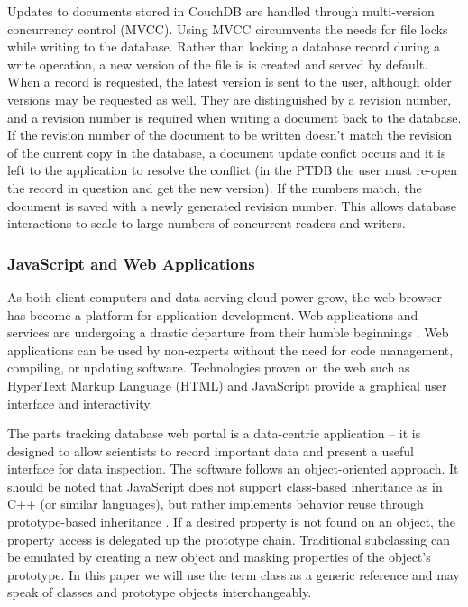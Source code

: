 \documentclass[journal]{IEEEtran}
\begin{document}
Updates to documents stored in CouchDB are handled through multi-version concurrency control (MVCC). Using MVCC
circumvents the needs for file locks while writing to the database. Rather than locking a database record during
a write operation, a new version of the file is is created and served by default. When a 
record is requested, the latest version is sent to the user, although older versions may be requested as well.
They are distinguished by a revision number, and a revision number is required when writing a document back 
to the database. If the revision number of the document to be written doesn't match the revision of the current
copy in the database,
a document update confict occurs and it is left to the application to resolve the conflict (in the PTDB the user must
re-open the record in question and get the new version). If the numbers match,
the document is saved with a newly generated revision number.
This allows database interactions to scale to large numbers of concurrent readers and writers.

\subsubsection{JavaScript and Web Applications}
As both client computers and data-serving cloud power grow, the web browser has become a
platform for application development. Web applications and services are undergoing
a drastic departure from their humble beginnings \cite{ginige_web}. Web applications can be used by 
non-experts without the need for code management, compiling, or updating software. Technologies proven on the web such as HyperText Markup Language (HTML)
and JavaScript provide a graphical user interface and interactivity. 

The parts tracking database web portal is a data-centric application -- it is designed
to allow scientists to record important data and present a useful interface for data inspection. The software follows an 
object-oriented approach. It should be noted that JavaScript does not support class-based inheritance as
in C++ (or similar languages), but rather implements behavior reuse through prototype-based inheritance \cite{gama_js_objects}. If a desired
property is not found on an object, the property access is delegated up the prototype chain. Traditional subclassing
can be emulated by creating a new object and masking properties of the object's prototype.
In this paper we will use the term class as a generic reference and may speak of
classes and prototype objects interchangeably.
\end{document}
